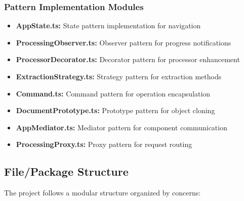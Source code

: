 \documentclass[11pt, a4paper]{article}
\theoremstyle{plain}
\theoremstyle{definition}
\begin{document}
\subsubsection{Pattern Implementation Modules}

\begin{itemize}
    \item \textbf{AppState.ts:} State pattern implementation for navigation
    \item \textbf{ProcessingObserver.ts:} Observer pattern for progress notifications
    \item \textbf{ProcessorDecorator.ts:} Decorator pattern for processor enhancement
    \item \textbf{ExtractionStrategy.ts:} Strategy pattern for extraction methods
    \item \textbf{Command.ts:} Command pattern for operation encapsulation
    \item \textbf{DocumentPrototype.ts:} Prototype pattern for object cloning
    \item \textbf{AppMediator.ts:} Mediator pattern for component communication
    \item \textbf{ProcessingProxy.ts:} Proxy pattern for request routing
\end{itemize}

\subsection{File/Package Structure}

The project follows a modular structure organized by concerns:
\end{document}
